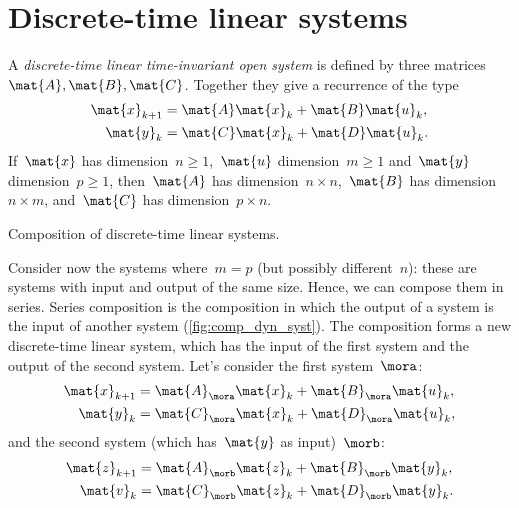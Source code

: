 
\section{Discrete-time linear systems}
\begin{definition}
    \label{def:discrete-time-linear-system}
    A \emph{discrete-time linear time-invariant open system} is defined by three matrices~$\mat{A},\mat{B},\mat{C}$.
    Together they give a recurrence of the type
    \begin{equation}
        \label{eq:discrete-time-dynamics}
        \begin{aligned}
            \mat{x}_{k+1} & =  \mat{A} \mat{x}_k  + \mat{B} \mat{u}_k, \\
            \mat{y}_{k}   & =  \mat{C} \mat{x}_k + \mat{D} \mat{u}_k.
        \end{aligned}
    \end{equation}
    If~$\mat{x}$ has dimension~$n\geq1$,~$\mat{u}$ dimension~$m\geq1$ and~$\mat{y}$ dimension~$p\geq1$, then~$\mat{A}$ has dimension~$n \times n$,~$\mat{B}$ has dimension~$n \times m$, and~$\mat{C}$ has dimension~$p \times n$.
\end{definition}

\begin{marginfigure}
    \centering
    \caption{Composition of discrete-time linear systems.}
    \label{fig:comp_dyn_syst}
\end{marginfigure}

Consider now the systems where~$m=p$ (but possibly different~$n$):
these are systems with input and output of the same size.
Hence, we can compose them in series.
Series composition is the composition in which the output of a system is the input of another system (\cref{fig:comp_dyn_syst}).
The composition forms a new discrete-time linear system, which has the input of the first system and the output of the second system.
Let's consider the first system~$\mora$:
%
\begin{equation*}
    \label{eq:dlin-1}
    \begin{aligned}
        \mat{x}_{k+1} & = \mat{A}_\mora \mat{x}_k + \mat{B}_\mora \mat{u}_k, \\
        \mat{y}_{k}   & = \mat{C}_\mora \mat{x}_k + \mat{D}_\mora \mat{u}_k,
    \end{aligned}
\end{equation*}
%
and the second system (which has~$\mat{y}$ as input)~$\morb$:
%
\begin{equation*}
    \label{eq:dlin-2}
    \begin{aligned}
        \mat{z}_{k+1} & = \mat{A}_\morb \mat{z}_k + \mat{B}_\morb \mat{y}_k, \\
        \mat{v}_{k}   & = \mat{C}_\morb \mat{z}_k+ \mat{D}_\morb \mat{y}_k.
    \end{aligned}
\end{equation*}

